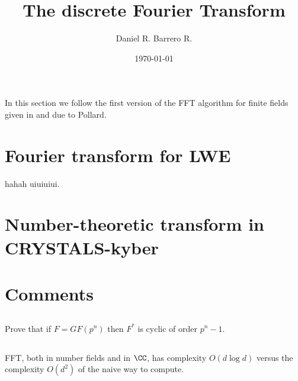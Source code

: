 \documentclass{amsart}
\title{The discrete Fourier Transform}
\author{Daniel R. Barrero R.}
\date{\today}
\begin{document}
\maketitle

\section{}

In this section we follow the first version of the FFT algorithm for finite
fields given in \cite{pollard-fftFiniteFields-1971} and due to Pollard.



\section{Fourier transform for LWE}

hahah \cite{regev-LWE-2009} uiuiuiui.

\section{Number-theoretic transform in CRYSTALS-kyber}

\section{Comments}

\subsection{} Prove that if $F = GF(p^n)$ then $F^*$ is cyclic of order
$p^n - 1$.

\subsection{} FFT, both in number fields and in $\CC$, has complexity
$O(d \log d)$ versus the complexity $O(d^2)$ of the naive way to compute.



\end{document}
